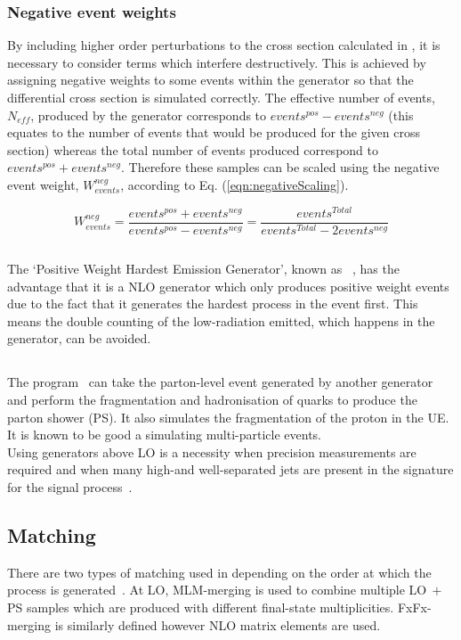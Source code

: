 \subsubsection{Negative event weights}
By including higher order perturbations to the cross section calculated in \aMCATNLO, it is necessary to consider terms which interfere destructively. This is achieved by assigning negative weights to some events within the generator so that the differential cross section is simulated correctly. The effective number of events, $N_{eff}$, produced by the generator corresponds to $events^{pos} - events^{neg}$ (this equates to the number of events that would be produced for the given cross section) whereas the total number of events produced correspond to $events^{pos} + events^{neg}$. Therefore these samples can be scaled using the negative event weight, $W_{events}^{neg}$, according to Eq. (\ref{eqn:negativeScaling}).

\begin{equation}
\label{eqn:negativeScaling}
W_{events}^{neg} = \frac{events^{pos} + events^{neg}}{events^{pos} - events^{neg}} = \frac{events^{Total}}{ events^{Total} - 2events^{neg}}
\end{equation}


\subsection{\POWHEG}
The `Positive Weight Hardest Emission Generator', known as \POWHEG~\cite{POWHEG}, has the advantage that it is a NLO generator which only produces positive weight events due to the fact that it generates the hardest process in the event first. This means the double counting of the low-\pt radiation emitted, which happens in the \aMCATNLO generator, can be avoided.  
\subsection{\PYTHIA}
The \PYTHIA program~\cite{pythia} can take the parton-level event generated by another generator and perform the fragmentation and hadronisation of quarks to produce the parton shower (PS). It also simulates the fragmentation of the proton in the UE. It is known to be good a simulating multi-particle events.\\

Using generators above LO is a necessity when precision measurements are required and when many high-\pt and well-separated jets are present in the signature for the signal process~\cite{Degrande:2014sta}. 

\subsection{Matching}
There are two types of matching used in \MADGRAPH depending on the order at which the process is generated~\cite{Degrande:2014sta}. At LO, MLM-merging is used to combine multiple LO$~+~$PS samples which are produced with different final-state multiplicities. FxFx-merging is similarly defined however NLO matrix elements are used.



